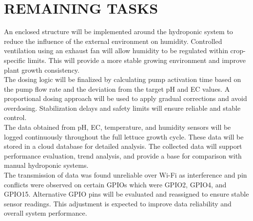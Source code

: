 \chapter{REMAINING TASKS}
An enclosed structure will be implemented around the hydroponic system to reduce the influence of the external environment on humidity. Controlled ventilation using an exhaust fan will allow humidity to be regulated within crop-specific limits. This will provide a more stable growing environment and improve plant growth consistency.\\[10pt]
The dosing logic will be finalized by calculating pump activation time based on the pump flow rate and the deviation from the target pH and EC values. A proportional dosing approach will be used to apply gradual corrections and avoid overdosing. Stabilization delays and safety limits will ensure reliable and stable control.\\[10pt]
The data obtained from pH, EC, temperature, and humidity sensors will be logged continuously throughout the full lettuce growth cycle. These data will be stored in a cloud database for detailed analysis. The collected data will support performance evaluation, trend analysis, and provide a base for comparison with manual hydroponic systems.\\[10pt]
The transmission of data was found unreliable over Wi-Fi as interference and pin conflicts were observed on certain GPIOs which were GPIO2, GPIO4, and GPIO15. Alternative GPIO pins will be evaluated and reassigned to ensure stable sensor readings. This adjustment is expected to improve data reliability and overall system performance.